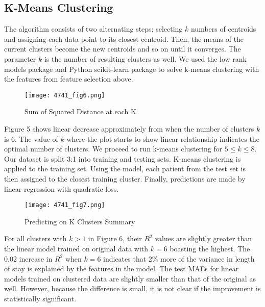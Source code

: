 \documentclass{article}
\begin{document}
\subsection{K-Means Clustering}
The algorithm consists of two alternating steps: selecting $k$ numbers of centroids and assigning each data point to its closest centroid. Then, the means of the current clusters become the new centroids and so on until it converges. The parameter $k$ is the number of resulting clusters as well. We used the low rank models package and Python scikit-learn package to solve k-means clustering with the features from feature selection above.
\begin{figure}[H]
    \centering
    \texttt{[image: 4741\_fig6.png]}
    \caption{Sum of Squared Distance at each K}
\end{figure}
\noindent
Figure 5 shows linear decrease approximately from when the number of clusters $k$ is 6. The value of $k$ where the plot starts to show linear relationship indicates the optimal number of clusters. We proceed to run k-means clustering for $5 \leq k \leq 8$. Our dataset is split 3:1 into training and testing sets. K-means clustering is applied to the training set. Using the model, each patient from the test set is then assigned to the closest training cluster. Finally, predictions are made by linear regression with quadratic loss.
\begin{figure}[H]
    \centering
    \texttt{[image: 4741\_fig7.png]}
    \caption{Predicting on K Clusters Summary}
\end{figure}
\noindent
For all clusters with $k > 1$ in Figure 6, their $R^2$ values are slightly greater than the linear model trained on original data with $k = 6$ boasting the highest. The 0.02 increase in $R^2$ when $k = 6$ indicates that 2\% more of the variance in length of stay is explained by the features in the model. The test MAEs for linear models trained on clustered data are slightly smaller than that of the original as well. However, because the difference is small, it is not clear if the improvement is statistically significant.
\newline
\end{document}
